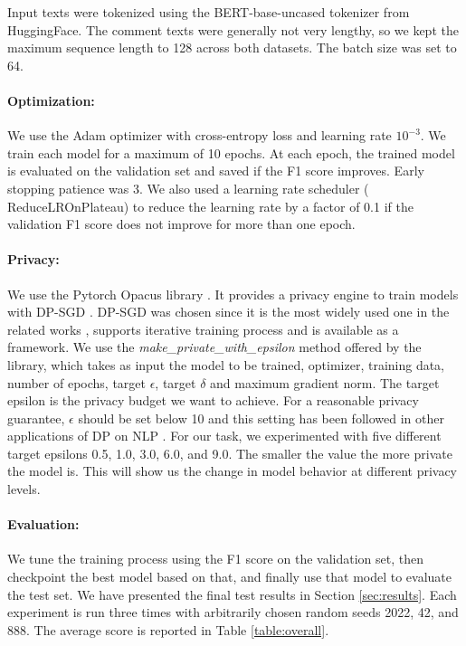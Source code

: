 \documentclass[11pt]{article} %
\begin{document}
Input texts were tokenized using the BERT-base-uncased tokenizer from HuggingFace. The comment texts were generally not very lengthy, so we kept the maximum sequence length to 128 across both datasets. The batch size was set to 64.

\paragraph{Optimization:} We use the Adam optimizer with cross-entropy loss and learning rate  $10^{-3}$. We train each model for a maximum of 10 epochs. At each epoch, the trained model is evaluated on the validation set and saved if the F1 score improves. Early stopping patience was 3. We also used a learning rate scheduler ( ReduceLROnPlateau) to reduce the learning rate by a factor of 0.1 if the validation F1 score does not improve for more than one epoch. 

\paragraph{Privacy:} We use the Pytorch Opacus library \citep{yousefpour2021opacus}. It provides a privacy engine to train models with DP-SGD \citep{abadi2016deep}. DP-SGD was chosen since it is the most widely used one in the related works \citep{ bagdasaryan-fairness, trandpfairness, anil2021large}, supports iterative training process and is available as a framework. We use the \textit{make\_private\_with\_epsilon} method offered by the library, which takes as input the model to be trained, optimizer, training data, number of epochs, target $\epsilon$, target $\delta$ and maximum gradient norm. The target epsilon is the privacy budget we want to achieve. For a reasonable privacy guarantee, $\epsilon$ should be set below 10 \citep{abadi2016deep} and this setting has been followed in other applications of DP on NLP \citep{bagdasaryan-fairness, anil2021large, lyu2020differentially}. For our task, we experimented with five different target epsilons 0.5, 1.0, 3.0, 6.0, and 9.0. The smaller the value the more private the model is. This will show us the change in model behavior at different privacy levels. 


\paragraph{Evaluation:} 
We tune the training process using the F1 score on the validation set, then checkpoint the best model based on that, and finally use that model to evaluate the test set. We have presented the final test results in Section \ref{sec:results}. Each experiment is run three times with arbitrarily chosen random seeds 2022, 42, and 888. The average score is reported in Table \ref{table:overall}. 
\end{document}

